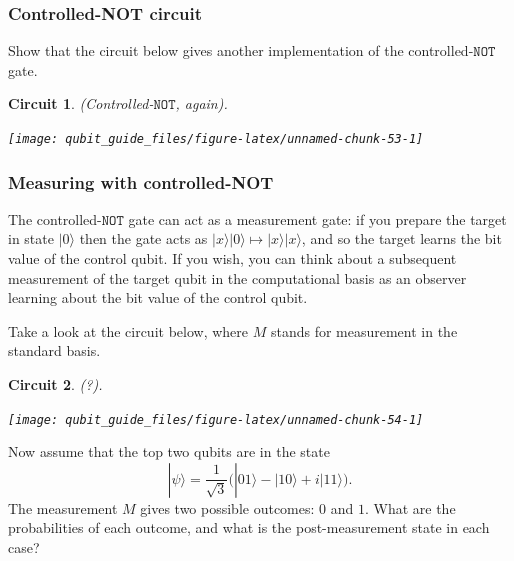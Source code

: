 \documentclass[fleqn,a4paper]{article}
\newtheorem*{circuit}{Circuit}
\theoremstyle{definition}
\theoremstyle{definition}
\theoremstyle{definition}
\theoremstyle{definition}
\theoremstyle{remark}
\begin{document}
\hypertarget{controlled-not-circuit}{%
\subsubsection{Controlled-NOT circuit}\label{controlled-not-circuit}}

Show that the circuit below gives another implementation of the controlled-\(\texttt{NOT}\) gate.

\begin{circuit}

\emph{(Controlled-\(\texttt{NOT}\), again).}

\begin{center}\texttt{[image: qubit\_guide\_files/figure-latex/unnamed-chunk-53-1]} \end{center}

\end{circuit}

\hypertarget{measuring-with-controlled-not}{%
\subsubsection{Measuring with controlled-NOT}\label{measuring-with-controlled-not}}

The controlled-\(\texttt{NOT}\) gate can act as a measurement gate: if you prepare the target in state \(|0\rangle\) then the gate acts as \(|x\rangle|0\rangle\mapsto|x\rangle|x\rangle\), and so the target learns the bit value of the control qubit.
If you wish, you can think about a subsequent measurement of the target qubit in the computational basis as an observer learning about the bit value of the control qubit.

Take a look at the circuit below, where \(M\) stands for measurement in the standard basis.

\begin{circuit}

\emph{(?).}

\begin{center}\texttt{[image: qubit\_guide\_files/figure-latex/unnamed-chunk-54-1]} \end{center}

\end{circuit}

Now assume that the top two qubits are in the state
\[
  |\psi\rangle
  = \frac{1}{\sqrt3}\big( |01\rangle - |10\rangle + i|11\rangle \big).
\]
The measurement \(M\) gives two possible outcomes: \(0\) and \(1\).
What are the probabilities of each outcome, and what is the post-measurement state in each case?
\end{document}
